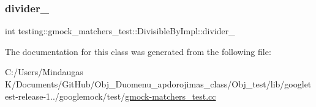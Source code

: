 \subsubsection{\texorpdfstring{divider\_}{divider\_}}
{\footnotesize\ttfamily int testing\+::gmock\+\_\+matchers\+\_\+test\+::\+Divisible\+By\+Impl\+::divider\+\_\+\hspace{0.3cm}{\ttfamily [private]}}



The documentation for this class was generated from the following file\+:\begin{DoxyCompactItemize}
\item 
C\+:/\+Users/\+Mindaugas K/\+Documents/\+Git\+Hub/\+Obj\+\_\+\+Duomenu\+\_\+apdorojimas\+\_\+class/\+Obj\+\_\+test/lib/googletest-\/release-\/1../googlemock/test/\mbox{\hyperlink{_obj__test_2lib_2googletest-release-1_88_81_2googlemock_2test_2gmock-matchers__test_8cc}{gmock-\/matchers\+\_\+test.\+cc}}\end{DoxyCompactItemize}

